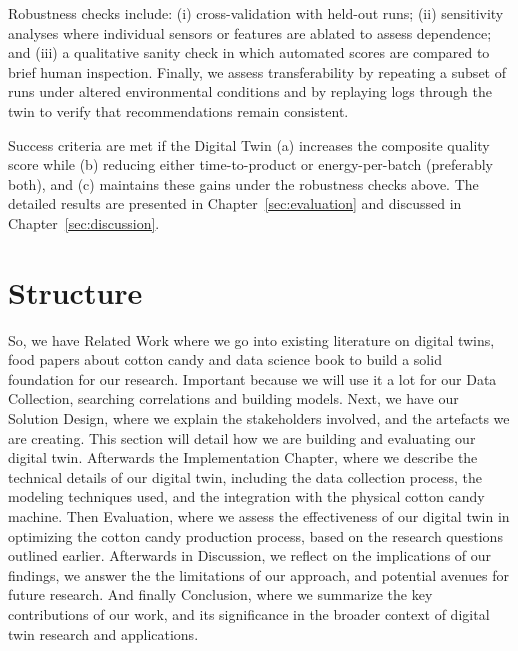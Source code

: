 Robustness checks include: (i) cross-validation with held-out runs; (ii) sensitivity analyses where individual sensors or features are ablated to assess dependence; and (iii) a qualitative sanity check in which automated scores are compared to brief human inspection. Finally, we assess transferability by repeating a subset of runs under altered environmental conditions and by replaying logs through the twin to verify that recommendations remain consistent.

Success criteria are met if the Digital Twin (a) increases the composite quality score while (b) reducing either time-to-product or energy-per-batch (preferably both), and (c) maintains these gains under the robustness checks above. The detailed results are presented in Chapter~\ref{sec:evaluation} and discussed in Chapter~\ref{sec:discussion}.

\section{Structure}
\label{sec:intro:struct}

So, we have Related Work where we go into existing literature on digital twins, food papers about cotton candy and data science book to build a solid foundation for our research. Important because we will use it a lot for our Data Collection, searching correlations and building models.
Next, we have our Solution Design, where we explain the stakeholders involved, and the artefacts we are creating. This section will detail how we are building and evaluating our digital twin. 
Afterwards the Implementation Chapter, where we describe the technical details of our digital twin, including the data collection process, the modeling techniques used, and the integration with the physical cotton candy machine.
Then Evaluation, where we assess the effectiveness of our digital twin in optimizing the cotton candy production process, based on the research questions outlined earlier.
Afterwards in Discussion, we reflect on the implications of our findings, we answer the  the limitations of our approach, and potential avenues for future research.
And finally Conclusion, where we summarize the key contributions of our work, and its significance in the broader context of digital twin research and applications.
